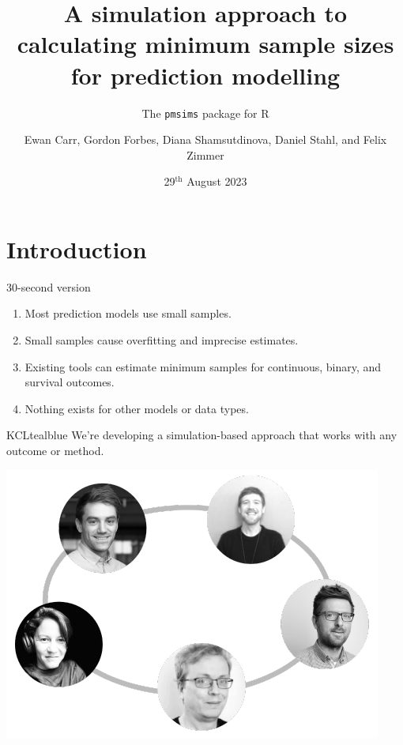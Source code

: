 \documentclass[11pt]{beamer}
\title[The \texttt{pmsims} package for R]{
    A simulation approach to calculating minimum sample sizes for prediction
    modelling
}
\subtitle{The \texttt{pmsims} package for R}
\date{29$^{\text{th}}$ August 2023}
\author[Biostatistics \& Health Informatics, KCL]{%
	Ewan Carr, Gordon Forbes, Diana Shamsutdinova, Daniel Stahl,
	and Felix Zimmer}
\institute[]{Department of Biostatistics \& Health Informatics\\ King's College London}
\newcommand{\sgap}{\vspace{0.5em}}
\begin{document}
\maketitle

\section{Introduction}

\begin{frame}[c]{30-second version}
	\Large
	\begin{enumerate}
		\setlength{\itemsep}{12pt}

		\item Most prediction models use small samples.

		\item Small samples cause overfitting and imprecise estimates.

		\item Existing tools can estimate minimum samples for continuous,
		      binary, and survival outcomes.

		\item Nothing exists for other models or data types.

	\end{enumerate}

	\sgap

	\begin{cbox}{KCLtealblue}{}
		We're developing a simulation-based approach that works with any
		outcome or method.
	\end{cbox}
	\vspace{-1em}
\end{frame}

\begin{frame}[c]
	\includegraphics[width=\textwidth]{figures/group_photos.pdf}
\end{frame}
\end{document}
